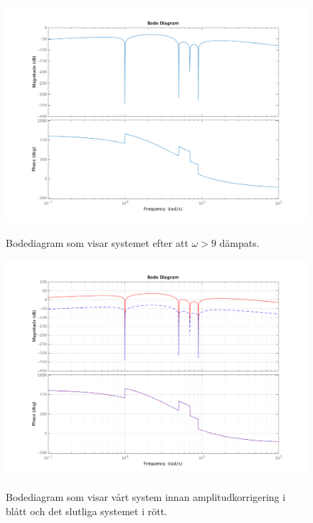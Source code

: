 \begin{figure}
    \caption{Bodediagram som visar systemet efter att $\omega > 9$ dämpats.}
    \centering
    \includegraphics[scale=0.55]{figures/task4b-bode.png}
    \label{fig:task4b-bode}
\end{figure}

\begin{figure}
    \caption{Bodediagram som visar vårt system innan amplitudkorrigering i
    blått och det slutliga systemet i rött.}
    \centering
    \includegraphics[scale=0.55]{figures/task4d-bode.png}
    \label{fig:task4d-bode}
\end{figure}

